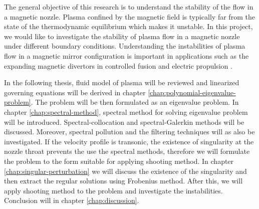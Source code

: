 The general objective of this research is to understand the stability of the flow in a magnetic nozzle. Plasma confined by the magnetic field is typically far from the state of the thermodynamic equilibrium which makes it unstable. In this project, we would like to investigate the stability of plasma flow in a magnetic nozzle under different boundary conditions. Understanding the instabilities of plasma flow in a magnetic mirror configuration is important in applications such as the expanding magnetic divertors in controlled fusion and electric propulsion \cite{ryutov_divertor_2016,kaganovich_2020_physics}.

In the following thesis, fluid model of plasma will be reviewed and linearized governing equations will be derived in chapter \ref{chap:polynomial-eigenvalue-problem}. The problem will be then formulated as an eigenvalue problem. In chapter \ref{chap:spectral-method}, spectral method for solving eigenvalue problem will be introduced. Spectral-collocation and spectral-Galerkin methods will be discussed. Moreover, spectral pollution and the filtering techniques will as also be investigated. If the velocity profile is transonic, the existence of singularity at the nozzle throat prevents the use the spectral methods, therefore we will formulate the problem to the form suitable for applying shooting method. In chapter \ref{chap:singular-perturbation} we will discuss the existence of the singularity and then extract the regular solutions using Frobenius method. After this, we will apply shooting method to the problem and investigate the instabilities. Conclusion will in chapter \ref{chap:discussion}.
